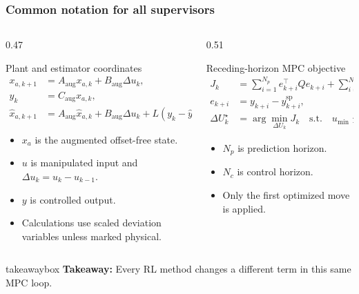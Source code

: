 \documentclass[aspectratio=169]{beamer}
\newcommand{\takeawaybox}[1]{%
\vspace{0.02cm}
\begin{center}
\begin{beamercolorbox}[wd=0.94\textwidth,sep=3pt,center,rounded=true,shadow=false]{takeawaybox}
\scriptsize
\textbf{\textcolor{maroon1}{Takeaway:}} #1
\end{beamercolorbox}
\end{center}
}
\begin{document}
\begin{frame}
\frametitle{\large \textbf{Common notation for all supervisors}}
\scriptsize

\begin{columns}[T,onlytextwidth]
\begin{column}{0.47\textwidth}
\begin{block}{Plant and estimator coordinates}
\begin{align*}
x_{a,k+1} &= A_{\mathrm{aug}}x_{a,k}+B_{\mathrm{aug}}\Delta u_k,\\
y_k &= C_{\mathrm{aug}}x_{a,k},\\
\hat{x}_{a,k+1} &= A_{\mathrm{aug}}\hat{x}_{a,k}
+B_{\mathrm{aug}}\Delta u_k+L(y_k-\hat{y}_k).
\end{align*}
\vspace{-0.15cm}
\begin{itemize}\justifying
  \setlength\itemsep{0.3ex}
  \item \(x_a\) is the augmented offset-free state.
  \item \(u\) is manipulated input and \(\Delta u_k=u_k-u_{k-1}\).
  \item \(y\) is controlled output.
  \item Calculations use scaled deviation variables unless marked physical.
\end{itemize}
\end{block}
\end{column}

\begin{column}{0.51\textwidth}
\begin{block}{Receding-horizon MPC objective}
\begin{align*}
J_k &= \sum_{i=1}^{N_p} e_{k+i}^{\top}Qe_{k+i}
+\sum_{i=0}^{N_c-1}\Delta u_{k+i}^{\top}R\Delta u_{k+i},\\
e_{k+i} &= y_{k+i}-y^{\mathrm{sp}}_{k+i},\\
\Delta U_k^\star &= \arg\min_{\Delta U_k} J_k
\quad \mathrm{s.t.}\quad u_{\min}\le u_{k+i}\le u_{\max}.
\end{align*}
\vspace{-0.15cm}
\begin{itemize}\justifying
  \setlength\itemsep{0.3ex}
  \item \(N_p\) is prediction horizon.
  \item \(N_c\) is control horizon.
  \item Only the first optimized move is applied.
\end{itemize}
\end{block}
\end{column}
\end{columns}

\takeawaybox{Every RL method changes a different term in this same MPC loop.}
\end{frame}
\end{document}
